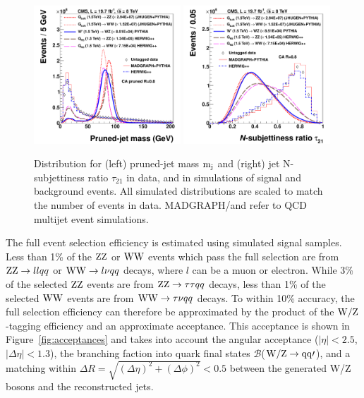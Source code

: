 \begin{figure}[htb]
\begin{center}
\includegraphics[width=0.49\textwidth]{EXO-12-024/figs/signal-acc-eff/signal-data-qcd-jetmass.pdf}
\includegraphics[width=0.49\textwidth]{EXO-12-024/figs/signal-acc-eff/signal-data-qcd-Jet-Tau21.pdf}
\end{center}
\caption{
Distribution for (left) pruned-jet mass ${\rm m_j}$ and (right) jet N-subjettiness ratio $\tau_{21}$ 
in data, and in simulations of signal and background events.
 All simulated distributions are scaled to match the number of events in data. 
 MADGRAPH/\PYTHIA and \HERWIG{++} refer to QCD multijet event simulations. 
}
\label{fig:taggingvariables}
\end{figure}


The full event selection efficiency is estimated using simulated
signal samples.
Less than 1\% of the ${\rm Z}{\rm Z}$ or ${\rm W}{\rm W}$ events which pass the full
selection are from ${\rm Z}{\rm Z} \to ll qq$ or ${\rm W}{\rm W} \to l\nu qq$
decays, where $l$ can be a muon or electron.  While 3\% of the
selected ${\rm Z}{\rm Z}$ events are from ${\rm Z}{\rm Z} \to \tau\tau qq$ decays,
less than 1\% of the selected ${\rm W}{\rm W}$ events are from ${\rm W}{\rm W} \to
\tau\nu qq$ decays.
To within 10\% accuracy,  the full selection efficiency can
therefore be
approximated by the product of the ${\rm W}/{\rm Z}$-tagging efficiency
and an approximate acceptance.
This acceptance is shown in Figure~\ref{fig:acceptances} and
takes into account the angular acceptance
($|\eta| < 2.5$, $|\Delta\eta|<1.3$),
the branching faction into quark final states
$\mathcal{B}$(${\rm {\rm W}/{\rm Z} \to qq\prime}$),  and a matching within
$\Delta R = \sqrt{(\Delta \eta)^2 + (\Delta\phi)^2} <0.5$
between the generated W/Z bosons and the reconstructed jets.



